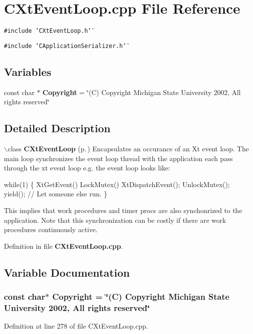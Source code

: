 \section{CXt\-Event\-Loop.cpp File Reference}
\label{CXtEventLoop_8cpp}
{\tt \#include \char`\"{}CXt\-Event\-Loop.h\char`\"{}}\par
{\tt \#include \char`\"{}CApplication\-Serializer.h\char`\"{}}\par
\subsection*{Variables}
\begin{CompactItemize}
\item 
const char $\ast$ {\bf Copyright} = \char`\"{}(C) Copyright Michigan State University 2002, All rights reserved\char`\"{}
\end{CompactItemize}


\subsection{Detailed Description}


$\backslash$class {\bf CXt\-Event\-Loop} {\rm (p.\,\pageref{classCXtEventLoop})}  Encapsulates an occurance of an Xt event loop.  The main loop synchronizes the event loop thread with the application each pass through the  xt event loop e.g. the event loop looks like:

while(1) \{ Xt\-Get\-Event() Lock\-Mutex() Xt\-Dispatch\-Event(); Unlock\-Mutex(); yield(); // Let someone else run. \}

This implies that work procedures and timer procs are also synchonrized to the application. Note that this synchronization can be costly if there are work procedures continuously active.



Definition in file {\bf CXt\-Event\-Loop.cpp}.

\subsection{Variable Documentation}
\subsubsection{\setlength{\rightskip}{0pt plus 5cm}const char$\ast$ Copyright = \char`\"{}(C) Copyright Michigan State University 2002, All rights reserved\char`\"{}\hspace{0.3cm}{\tt  [static]}}\label{CXtEventLoop_8cpp_a0}




Definition at line 278 of file CXt\-Event\-Loop.cpp.